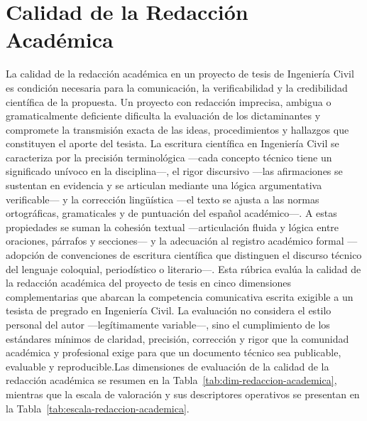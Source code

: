 \clearpage
\section{Calidad de la Redacción Académica}

{\footnotesize
La calidad de la redacción académica en un proyecto de tesis de Ingeniería Civil es condición necesaria para la comunicación, la verificabilidad y la credibilidad científica de la propuesta. Un proyecto con redacción imprecisa, ambigua o gramaticalmente deficiente dificulta la evaluación de los dictaminantes y compromete la transmisión exacta de las ideas, procedimientos y hallazgos que constituyen el aporte del tesista. La escritura científica en Ingeniería Civil se caracteriza por la precisión terminológica —cada concepto técnico tiene un significado unívoco en la disciplina—, el rigor discursivo —las afirmaciones se sustentan en evidencia y se articulan mediante una lógica argumentativa verificable— y la corrección lingüística —el texto se ajusta a las normas ortográficas, gramaticales y de puntuación del español académico—. A estas propiedades se suman la cohesión textual —articulación fluida y lógica entre oraciones, párrafos y secciones— y la adecuación al registro académico formal —adopción de convenciones de escritura científica que distinguen el discurso técnico del lenguaje coloquial, periodístico o literario—. Esta rúbrica evalúa la calidad de la redacción académica del proyecto de tesis en cinco dimensiones complementarias que abarcan la competencia comunicativa escrita exigible a un tesista de pregrado en Ingeniería Civil. La evaluación no considera el estilo personal del autor —legítimamente variable—, sino el cumplimiento de los estándares mínimos de claridad, precisión, corrección y rigor que la comunidad académica y profesional exige para que un documento técnico sea publicable, evaluable y reproducible.Las dimensiones de evaluación de la calidad de la redacción académica se resumen en la Tabla~\ref{tab:dim-redaccion-academica}, mientras que la escala de valoración y sus descriptores operativos se presentan en la Tabla~\ref{tab:escala-redaccion-academica}.\par
}

